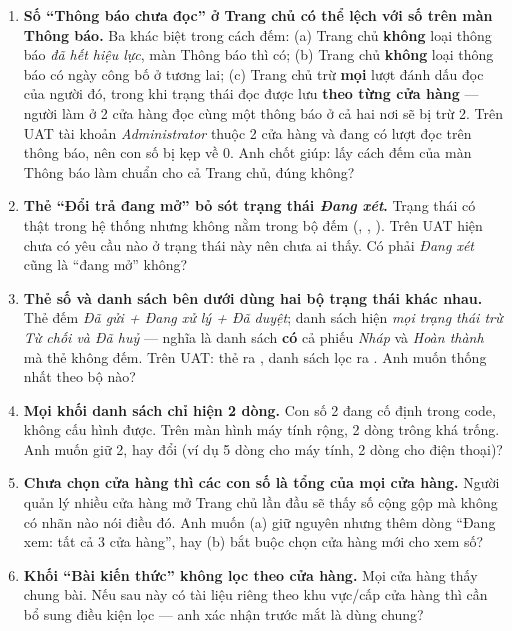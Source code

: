 \begin{ask}
\begin{enumerate}[leftmargin=*]
  \item \textbf{Số ``Thông báo chưa đọc'' ở Trang chủ có thể lệch với số trên màn Thông báo.}
        Ba khác biệt trong cách đếm: (a) Trang chủ \textbf{không} loại thông báo \emph{đã hết
        hiệu lực}, màn Thông báo thì có; (b) Trang chủ \textbf{không} loại thông báo có ngày
        công bố ở tương lai; (c) Trang chủ trừ \textbf{mọi} lượt đánh dấu đọc của người đó,
        trong khi trạng thái đọc được lưu \textbf{theo từng cửa hàng} --- người làm ở 2 cửa hàng
        đọc cùng một thông báo ở cả hai nơi sẽ bị trừ 2. Trên UAT tài khoản
        \emph{Administrator} thuộc 2 cửa hàng và đang có  lượt đọc trên  thông
        báo, nên con số bị kẹp về 0. Anh chốt giúp: lấy cách đếm của màn Thông báo làm chuẩn
        cho cả Trang chủ, đúng không?
  \item \textbf{Thẻ ``Đổi trả đang mở'' bỏ sót trạng thái \emph{Đang xét}.} Trạng thái
         có thật trong hệ thống nhưng không nằm trong bộ đếm
        (, , ). Trên UAT hiện chưa có yêu cầu nào ở
        trạng thái này nên chưa ai thấy. Có phải \emph{Đang xét} cũng là ``đang mở'' không?
  \item \textbf{Thẻ số và danh sách bên dưới dùng hai bộ trạng thái khác nhau.} Thẻ đếm
        \emph{Đã gửi + Đang xử lý + Đã duyệt}; danh sách hiện \emph{mọi trạng thái trừ Từ chối
        và Đã huỷ} --- nghĩa là danh sách \textbf{có} cả phiếu \emph{Nháp} và \emph{Hoàn thành}
        mà thẻ không đếm. Trên UAT: thẻ ra , danh sách lọc ra . Anh muốn thống
        nhất theo bộ nào?
  \item \textbf{Mọi khối danh sách chỉ hiện 2 dòng.} Con số 2 đang cố định trong code, không
        cấu hình được. Trên màn hình máy tính rộng, 2 dòng trông khá trống. Anh muốn giữ 2, hay
        đổi (ví dụ 5 dòng cho máy tính, 2 dòng cho điện thoại)?
  \item \textbf{Chưa chọn cửa hàng thì các con số là tổng của mọi cửa hàng.} Người quản lý nhiều
        cửa hàng mở Trang chủ lần đầu sẽ thấy số cộng gộp mà không có nhãn nào nói điều đó. Anh
        muốn (a) giữ nguyên nhưng thêm dòng ``Đang xem: tất cả 3 cửa hàng'', hay (b) bắt buộc
        chọn cửa hàng mới cho xem số?
  \item \textbf{Khối ``Bài kiến thức'' không lọc theo cửa hàng.} Mọi cửa hàng thấy chung
         bài. Nếu sau này có tài liệu riêng theo khu vực/cấp cửa hàng thì cần bổ sung
        điều kiện lọc --- anh xác nhận trước mắt là dùng chung?
\end{enumerate}
\end{ask}


